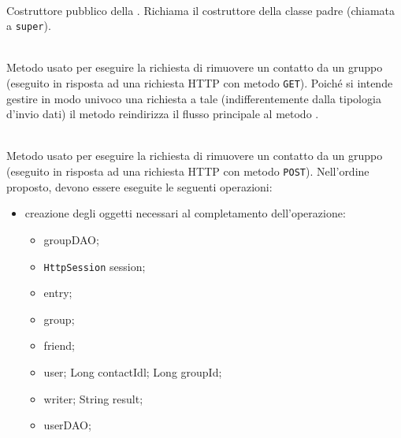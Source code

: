 \begin{description}
	\item{}\\
	Costruttore pubblico della . Richiama il costruttore della classe padre (chiamata a \texttt{super}).
	
	\item{}\\
	Metodo usato per eseguire la richiesta di rimuovere un contatto da un gruppo (eseguito in risposta ad una richiesta HTTP con metodo \texttt{GET}). Poiché si intende gestire in modo univoco una richiesta a tale  (indifferentemente dalla tipologia d'invio dati) il metodo reindirizza il flusso principale al metodo .
	
	\item{}\\	
	Metodo usato per eseguire la richiesta di rimuovere un contatto da un gruppo (eseguito in risposta ad una richiesta HTTP con metodo \texttt{POST}). Nell'ordine proposto, devono essere eseguite le seguenti operazioni:
	\begin{itemize}
		\item creazione degli oggetti necessari al completamento dell'operazione:
		\begin{itemize}
			\item {} groupDAO;
			\item \texttt{HttpSession} session;
			\item {} entry;
			\item {} group;
			\item {} friend;
			\item {} user;
			Long contactIdl;
			Long groupId;
			\item {} writer;
			String result;
			\item {} userDAO;
		\end{itemize}
		

\end{itemize}
\end{description}
